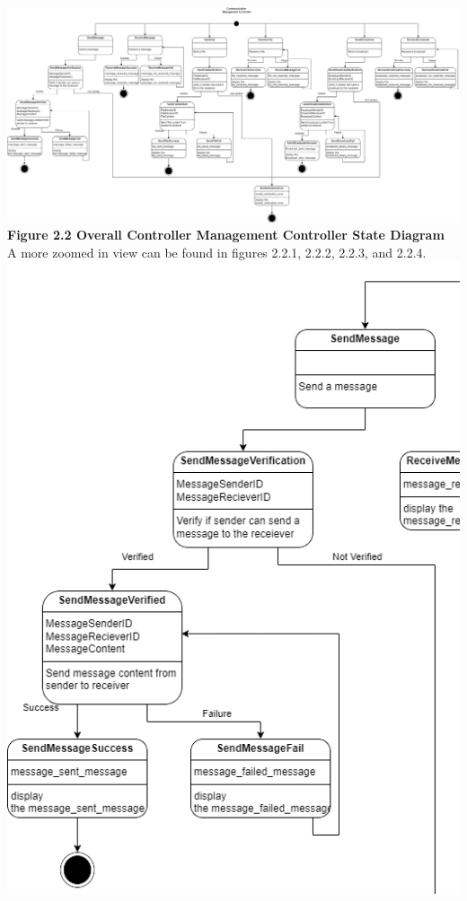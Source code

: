 \documentclass[]{article}
\begin{document}
\begin{center}
\includegraphics[width=\textwidth]{../images/ControllerStateDiagrams/CommunicationManagementController.drawio.png}
\textbf{Figure 2.2 Overall Controller Management Controller State Diagram}
\\A more zoomed in view can be found in figures 2.2.1, 2.2.2, 2.2.3, and 2.2.4.
\includegraphics{../images/ControllerStateDiagrams/CMC1.png}\\

\end{center}
\end{document}
